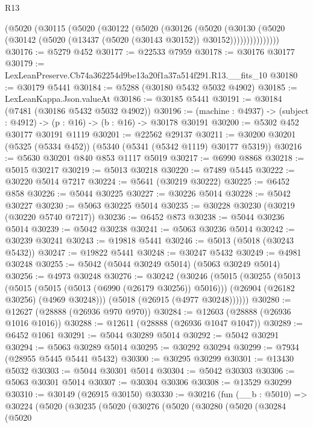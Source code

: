 \begin{lexlean}{R13}
\begin{coremodule}
          (@5020
            (@30115
              (@5020
                (@30122
                  (@5020
                    (@30126
                      (@5020
                        (@30130
                          (@5020
                            (@30142 (@5020 (@13437 (@5020 (@30143 @30152)) @30152)))))))))))))))
@30176 := @5279 @452
@30177 := @22533 @7959
@30178 := @30176 @30177
@30179 := LexLeanPreserve.Cb74a362254d9be13a20f1a37a514f291.R13.__fits_10
@30180 := @30179 @5441
@30184 := @5288 (@30180 @5432 @5032 @4902)
@30185 := LexLeanKappa.Json.valueAt
@30186 := @30185 @5441
@30191 := @30184 (@7481 (@30186 @5432 @5032 @4902))
@30196 := (machine : @4937) -> (subject : @4912) -> (p : @16) -> (b : @16) -> @30178 @30191
@30200 := @5302 @452 @30177 @30191 @1119
@30201 := @22562 @29137
@30211 := @30200 @30201 (@5325 (@5334 @452)) (@5340 (@5341 (@5342 @1119) @30177 @5319))
@30216 := @5630 @30201 @840 @853 @1117 @5019
@30217 := @6990 @8868
@30218 := @5015 @30217
@30219 := @5013 @30218
@30220 := @7489 @5445
@30222 := @30220 @5014 @7217
@30224 := @5641 (@30219 @30222)
@30225 := @6452 @858
@30226 := @5044 @30225
@30227 := @30226 @5014
@30228 := @5042 @30227
@30230 := @5063 @30225 @5014
@30235 := @30228 @30230 (@30219 (@30220 @5740 @7217))
@30236 := @6452 @873
@30238 := @5044 @30236 @5014
@30239 := @5042 @30238
@30241 := @5063 @30236 @5014
@30242 := @30239 @30241
@30243 := @19818 @5441
@30246 := @5013 (@5018 (@30243 @5432))
@30247 := @19822 @5441
@30248 := @30247 @5432
@30249 := @4981 @30248
@30255 := @5042 (@5044 @30249 @5014) (@5063 @30249 @5014)
@30256 := @4973 @30248
@30276 := @30242
    (@30246
      (@5015
        (@30255
          (@5013
            (@5015 (@5015 (@5013 (@6990 (@26179 @30256)) @5016)))
            (@26904 (@26182 @30256) (@4969 @30248)))
          (@5018 (@26915 (@4977 @30248))))))
@30280 := @12627 (@28888 (@26936 @970 @970))
@30284 := @12603 (@28888 (@26936 @1016 @1016))
@30288 := @12611 (@28888 (@26936 @1047 @1047))
@30289 := @6452 @1061
@30291 := @5044 @30289 @5014
@30292 := @5042 @30291
@30294 := @5063 @30289 @5014
@30295 := @30292 @30294
@30299 := @7934 (@28955 @5445 @5441 @5432)
@30300 := @30295 @30299
@30301 := @13430 @5032
@30303 := @5044 @30301 @5014
@30304 := @5042 @30303
@30306 := @5063 @30301 @5014
@30307 := @30304 @30306
@30308 := @13529 @30299
@30310 := @30149 (@26915 @30150)
@30330 := @30216
    (fun (__b : @5010) =>
    @30224
      (@5020
        (@30235
          (@5020
            (@30276
              (@5020
                (@30280
                  (@5020
                    (@30284
                      (@5020

\end{coremodule}
\end{lexlean}
